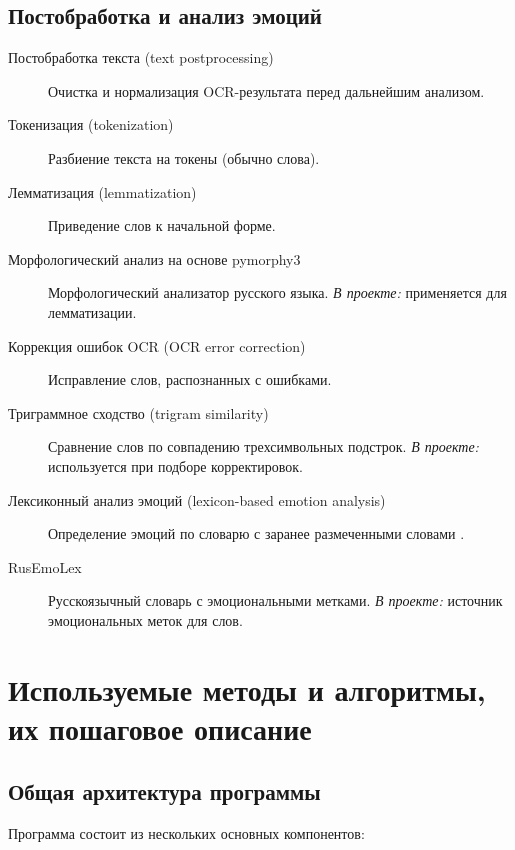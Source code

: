 \documentclass[12pt,a4paper]{article}
\begin{document}
\subsection{Постобработка и анализ эмоций}

\begin{description}
    \item[Постобработка текста (text postprocessing)]
    Очистка и нормализация OCR-результата перед дальнейшим анализом.

    \item[Токенизация (tokenization)]
    Разбиение текста на токены (обычно слова).

    \item[Лемматизация (lemmatization)]
    Приведение слов к начальной форме.

    \item[Морфологический анализ на основе pymorphy3]
    Морфологический анализатор русского языка.
    \textit{В проекте:} применяется для лемматизации.

    \item[Коррекция ошибок OCR (OCR error correction)]
    Исправление слов, распознанных с ошибками.

    \item[Триграммное сходство (trigram similarity)]
    Сравнение слов по совпадению трехсимвольных подстрок.
    \textit{В проекте:} используется при подборе корректировок.

    \item[Лексиконный анализ эмоций (lexicon-based emotion analysis)]
    Определение эмоций по словарю с заранее размеченными словами \cite{anew1999,norms2013}.

    \item[RusEmoLex]
    Русскоязычный словарь с эмоциональными метками.
    \textit{В проекте:} источник эмоциональных меток для слов.
\end{description}


\section{Используемые методы и алгоритмы, их пошаговое описание}

\subsection{Общая архитектура программы}
Программа состоит из нескольких основных компонентов:
\end{document}
